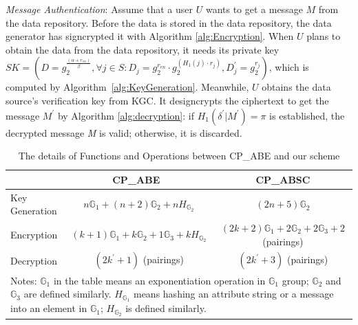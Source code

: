 \documentclass[letterpaper,12pt]{article}
\newcommand{\Gone}{\mathbb{G}_1}
\newcommand{\Gtwo}{\mathbb{G}_2}
\newcommand{\Gthree}{\mathbb{G}_3}
\begin{document}
\emph{Message Authentication}: Assume that a user $U$ wants to get a message $M$ from the data repository. Before the data is stored in the data repository, the data generator has signcrypted it with  Algorithm \ref{alg:Encryption}. When $U$ plans to obtain the data from the data repository, it needs its private key $SK= (D=g_2^{\frac{(\alpha+r_{en})}{\beta}}, \forall j \in S: D_j=g_2^{r_{en}}\cdot g_2^{(H_1(j)\cdot {r_j})}, D_j^\prime=g_2^{r_j})$, which is computed by  Algorithm~\ref{alg:KeyGeneration}. Meanwhile, $U$ obtains the data source's verification key from KGC. It designcrypts the ciphertext to get the message $M^\prime$ by  Algorithm \ref{alg:decryption}: if $H_1(\delta^\prime|M^\prime) = \pi$ is established, the decrypted message \emph{M} is valid; otherwise, it is discarded.



\begin{table}[tb]
\caption{The details of Functions and Operations between CP\_ABE and our scheme}\label{table:comparison computation cost between CP-ABE and our scheme}
\centering
\begin{tabular}{l| c| c}
\hline
   & CP\_ABE~\cite{bethencourt2007ciphertext}  & CP\_ABSC  \\
\hline
Key Generation&$n\Gone + (n+2)\Gtwo + nH_{\Gtwo}$ & $(2n+5)\Gtwo$\\
Encryption&$(k+1)\Gone + k\Gtwo + 1\Gthree + kH_{\Gtwo}$&$(2k+2)\Gone + 2\Gtwo + 2\Gthree + 2$ (pairings) \\
Decryption&$(2k^\prime + 1)$ (pairings)&$(2k^\prime+3)$ (pairings)\\
\hline
\multicolumn{3}{p{12cm}}{Notes: $\Gone$ in the table means an exponentiation operation in $\Gone$ group; $\Gtwo$ and $\Gthree$ are defined similarly. $H_{\Gone}$ means hashing an attribute string or a message into an element in $\Gone$; $H_{\Gtwo}$ is defined similarly.}
\end{tabular}
\end{table}
\end{document}

